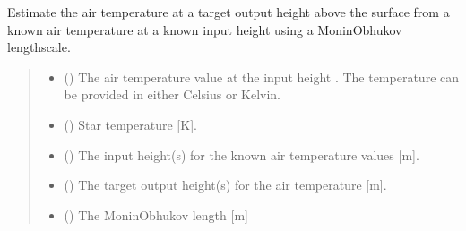 \documentclass[letterpaper,10pt,english]{sphinxmanual}
\begin{document}
\begin{fulllineitems}
\label{\detokenize{users_guide:AirSeaFluxCode.height_subs.adjust_temperature}}
\pysigstartsignatures
\pysiglinewithargsret
{}
{\sphinxparamcomma {}\sphinxparamcomma {}\sphinxparamcomma {}\sphinxparamcomma {}\sphinxparamcomma {}\sphinxparamcomma {}}
{}
\pysigstopsignatures
\sphinxAtStartPar
Estimate the air temperature at a target output height above the surface from a
known air temperature at a known input height using a Monin\sphinxhyphen{}Obhukov length\sphinxhyphen{}scale.
\begin{quote}\begin{description}
\begin{itemize}
\item {}
\sphinxAtStartPar
{} () \textendash{} The air temperature value at the input height . The temperature can be
provided in either Celsius or Kelvin.

\item {}
\sphinxAtStartPar
{} () \textendash{} Star temperature {[}K{]}.

\item {}
\sphinxAtStartPar
{} (\sphinxstyleliteralemphasis{\sphinxupquote{ | }}) \textendash{} The input height(s) for the known air temperature values {[}m{]}.

\item {}
\sphinxAtStartPar
{} (\sphinxstyleliteralemphasis{\sphinxupquote{ | }}) \textendash{} The target output height(s) for the air temperature {[}m{]}.

\item {}
\sphinxAtStartPar
{} () \textendash{} The Monin\sphinxhyphen{}Obhukov length {[}m{]}


\end{itemize}
\end{description}
\end{quote}
\end{fulllineitems}
\end{document}
